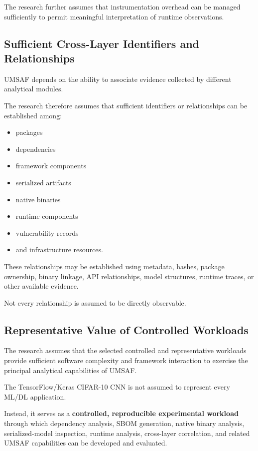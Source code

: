 \documentclass[
  12pt,
  letterpaper,
  oneside]{report}
\providecommand{\tightlist}{%
  \setlength{\itemsep}{0pt}\setlength{\parskip}{0pt}}
\begin{document}
The research further assumes that instrumentation overhead can be
managed sufficiently to permit meaningful interpretation of runtime
observations.

\subsection{Sufficient Cross-Layer Identifiers and Relationships}\label{1327-sufficient-cross-layer-identifiers-and-relationships}

UMSAF depends on the ability to associate evidence collected by
different analytical modules.

The research therefore assumes that sufficient identifiers or
relationships can be established among:

\begin{itemize}
\tightlist
\item
  packages
\item
  dependencies
\item
  framework components
\item
  serialized artifacts
\item
  native binaries
\item
  runtime components
\item
  vulnerability records
\item
  and infrastructure resources.
\end{itemize}

These relationships may be established using metadata, hashes, package
ownership, binary linkage, API relationships, model structures, runtime
traces, or other available evidence.

Not every relationship is assumed to be directly observable.

\subsection{Representative Value of Controlled Workloads}\label{1328-representative-value-of-controlled-workloads}

The research assumes that the selected controlled and representative
workloads provide sufficient software complexity and framework
interaction to exercise the principal analytical capabilities of UMSAF.

The TensorFlow/Keras CIFAR-10 CNN is not assumed to represent every
ML/DL application.

Instead, it serves as a \textbf{controlled, reproducible experimental
workload} through which dependency analysis, SBOM generation, native
binary analysis, serialized-model inspection, runtime analysis,
cross-layer correlation, and related UMSAF capabilities can be developed
and evaluated.
\end{document}
